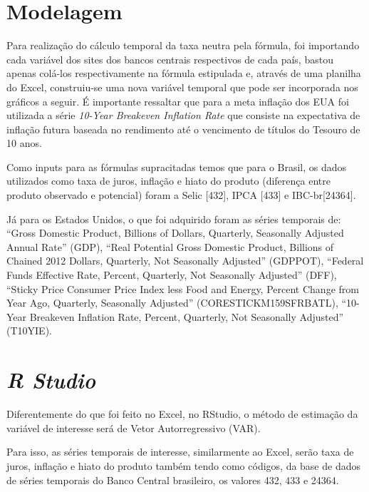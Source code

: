 \section*{Modelagem}

Para realiza\c{c}\~{a}o do c\'{a}lculo temporal da taxa neutra pela f\'{o}rmula, foi importando cada vari\'{a}vel dos sites dos bancos centrais respectivos de cada pa\'{i}s, bastou apenas col\'{a}-los respectivamente na f\'{o}rmula estipulada e, atrav\'{e}s de uma planilha do Excel, construiu-se uma nova vari\'{a}vel temporal que pode ser incorporada nos gr\'{a}ficos a seguir. \'{E} importante ressaltar que para a meta infla\c{c}\~{a}o dos EUA foi utilizada a s\'{e}rie \textit{10-Year Breakeven Inflation Rate }que consiste na expectativa de infla\c{c}\~{a}o futura baseada no rendimento at\'{e} o vencimento de t\'{i}tulos do Tesouro de 10 anos. \textbf{}

 Como inputs para as f\'{o}rmulas supracitadas temos que para o Brasil, os dados utilizados como taxa de juros, infla\c{c}\~{a}o e hiato do produto (diferen\c{c}a entre produto observado e potencial) foram a Selic [432], IPCA [433] e IBC-br[24364]. 

 J\'{a} para os Estados Unidos, o que foi adquirido foram as s\'{e}ries temporais de: ``Gross Domestic Product, Billions of Dollars, Quarterly, Seasonally Adjusted Annual Rate'' (GDP), ``Real Potential Gross Domestic Product, Billions of Chained 2012 Dollars, Quarterly, Not Seasonally Adjusted'' (GDPPOT), ``Federal Funds Effective Rate, Percent, Quarterly, Not Seasonally Adjusted'' (DFF), ``Sticky Price Consumer Price Index less Food and Energy, Percent Change from Year Ago, Quarterly, Seasonally Adjusted'' (CORESTICKM159SFRBATL), ``10-Year Breakeven Inflation Rate, Percent, Quarterly, Not Seasonally Adjusted'' (T10YIE). 

\section*{\textit{R Studio}}

 Diferentemente do que foi feito no Excel, no RStudio, o m\'{e}todo de estima\c{c}\~{a}o da vari\'{a}vel de interesse ser\'{a} de Vetor Autorregressivo (VAR).

 Para isso, as s\'{e}ries temporais de interesse, similarmente ao Excel, ser\~{a}o taxa de juros, infla\c{c}\~{a}o e hiato do produto tamb\'{e}m tendo como c\'{o}digos, da base de dados de s\'{e}ries temporais do Banco Central brasileiro, os valores 432, 433 e 24364. 

